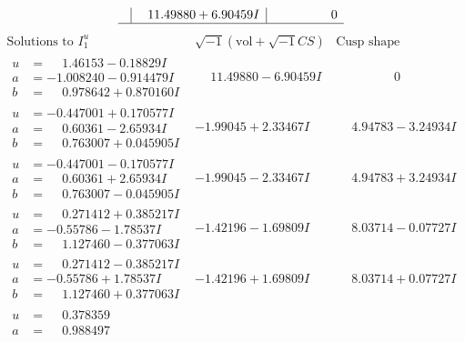 \documentclass[1p]{elsarticle_modified}
\theoremstyle{definition}
\newcommand{\I}{\sqrt{-1}}
\begin{document}
$$\begin{array}{c|c|c}
 & \phantom{-}11.49880 + 6.90459 I & \phantom{-0.000000 } 0\\
 \hline 
 \end{array}$$\newpage$$\begin{array}{c|c|c}  
\text{Solutions to }I^u_{1}& \I (\text{vol} + \sqrt{-1}CS) & \text{Cusp shape}\\
 \hline 
\begin{aligned}
u &= \phantom{-}1.46153 - 0.18829 I \\
a &= -1.008240 - 0.914479 I \\
b &= \phantom{-}0.978642 + 0.870160 I\end{aligned}
 & \phantom{-}11.49880 - 6.90459 I & \phantom{-0.000000 } 0 \\ \hline\begin{aligned}
u &= -0.447001 + 0.170577 I \\
a &= \phantom{-}0.60361 - 2.65934 I \\
b &= \phantom{-}0.763007 + 0.045905 I\end{aligned}
 & -1.99045 + 2.33467 I & \phantom{-}4.94783 - 3.24934 I \\ \hline\begin{aligned}
u &= -0.447001 - 0.170577 I \\
a &= \phantom{-}0.60361 + 2.65934 I \\
b &= \phantom{-}0.763007 - 0.045905 I\end{aligned}
 & -1.99045 - 2.33467 I & \phantom{-}4.94783 + 3.24934 I \\ \hline\begin{aligned}
u &= \phantom{-}0.271412 + 0.385217 I \\
a &= -0.55786 - 1.78537 I \\
b &= \phantom{-}1.127460 - 0.377063 I\end{aligned}
 & -1.42196 - 1.69809 I & \phantom{-}8.03714 - 0.07727 I \\ \hline\begin{aligned}
u &= \phantom{-}0.271412 - 0.385217 I \\
a &= -0.55786 + 1.78537 I \\
b &= \phantom{-}1.127460 + 0.377063 I\end{aligned}
 & -1.42196 + 1.69809 I & \phantom{-}8.03714 + 0.07727 I \\ \hline\begin{aligned}
u &= \phantom{-}0.378359\phantom{ +0.000000I} \\
a &= \phantom{-}0.988497\phantom{ +0.000000I} \\

\end{aligned}
\end{array}$$
\end{document}

